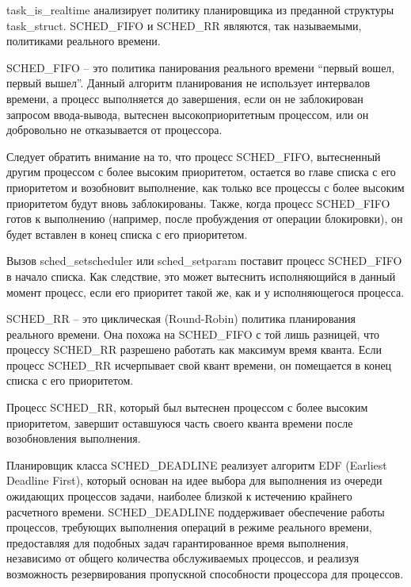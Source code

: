 
task\_is\_realtime анализирует политику планировщика из преданной структуры task\_struct. SCHED\_FIFO и SCHED\_RR являются, так называемыми, политиками реального времени. 

SCHED\_FIFO -- это политика панирования реального времени ``первый  вошел, первый вышел''.   Данный алгоритм планирования не использует интервалов времени, а процесс выполняется до завершения, если он не заблокирован запросом ввода-вывода, вытеснен высокоприоритетным процессом, или он добровольно не отказывается от процессора. \cite{scheduling}

Следует обратить внимание на то, что процесс SCHED\_FIFO, вытесненный другим процессом с более высоким приоритетом, остается во главе списка с его приоритетом и возобновит выполнение, как только все процессы с более высоким приоритетом будут вновь заблокированы. Также, когда процесс SCHED\_FIFO готов к выполнению (например, после пробуждения от операции блокировки), он будет вставлен в конец списка с его приоритетом. \cite{scheduling}

Вызов sched\_setscheduler или sched\_setparam поставит процесс SCHED\_FIFO в начало списка. Как следствие, это может вытеснить исполняющийся в данный момент процесс, если его приоритет такой же, как и у исполняющегося процесса. \cite{scheduling}

SCHED\_RR -- это циклическая (Round-Robin) политика планирования реального времени. Она похожа на SCHED\_FIFO с той лишь разницей, что процессу SCHED\_RR разрешено работать как максимум время кванта. Если процесс SCHED\_RR исчерпывает свой квант времени, он помещается в конец списка с его приоритетом. \cite{scheduling}

Процесс SCHED\_RR, который был вытеснен процессом с более высоким приоритетом, завершит оставшуюся часть своего кванта времени после возобновления выполнения. \cite{scheduling}

Планировщик класса SCHED\_DEADLINE реализует алгоритм EDF (Earliest Deadline First), который основан на идее выбора для выполнения из очереди ожидающих процессов задачи, наиболее близкой к истечению крайнего расчетного времени. SCHED\_DEADLINE поддерживает обеспечение работы процессов, требующих выполнения операций в режиме реального времени, предоставляя для подобных задач гарантированное время выполнения, независимо от общего количества обслуживаемых процессов, и реализуя возможность резервирования пропускной способности процессора для процессов. \cite{sched_deadline}

